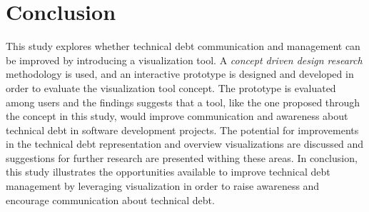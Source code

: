 \section{Conclusion}
This study explores whether technical debt communication and management can be improved by introducing a visualization tool.
A \textit{concept driven design research} methodology is used, and an interactive prototype is designed and developed in order to evaluate the visualization tool concept.
The prototype is evaluated among users and the findings suggests that a tool, like the one proposed through the concept in this study, would improve communication and awareness about technical debt in software development projects.
The potential for improvements in the technical debt representation and overview visualizations are discussed and suggestions for further research are presented withing these areas.
In conclusion, this study illustrates the opportunities available to improve technical debt management by leveraging visualization in order to raise awareness and encourage communication about technical debt.